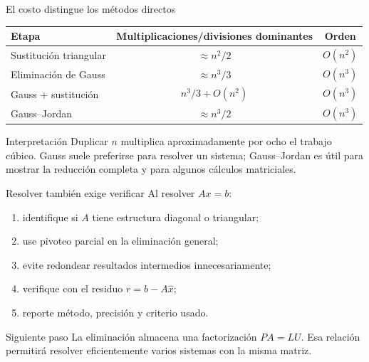 \documentclass[aspectratio=169,12pt]{beamer}
\begin{document}
\begin{frame}{El costo distingue los métodos directos}
\begin{center}
\begin{tabular}{lcc}
\toprule
Etapa & Multiplicaciones/divisiones dominantes & Orden \\
\midrule
Sustitución triangular & $\approx n^2/2$ & $O(n^2)$ \\
Eliminación de Gauss & $\approx n^3/3$ & $O(n^3)$ \\
Gauss + sustitución & $n^3/3+O(n^2)$ & $O(n^3)$ \\
Gauss--Jordan & $\approx n^3/2$ & $O(n^3)$ \\
\bottomrule
\end{tabular}
\end{center}
\begin{block}{Interpretación}
Duplicar $n$ multiplica aproximadamente por ocho el trabajo cúbico.
Gauss suele preferirse para resolver un sistema; Gauss--Jordan es útil para
mostrar la reducción completa y para algunos cálculos matriciales.
\end{block}
\end{frame}

\begin{frame}{Resolver también exige verificar}
Al resolver $Ax=b$:
\begin{enumerate}
  \item identifique si $A$ tiene estructura diagonal o triangular;
  \item use pivoteo parcial en la eliminación general;
  \item evite redondear resultados intermedios innecesariamente;
  \item verifique con el residuo $r=b-A\widehat x$;
  \item reporte método, precisión y criterio usado.
\end{enumerate}
\begin{block}{Siguiente paso}
La eliminación almacena una factorización $PA=LU$. Esa relación permitirá
resolver eficientemente varios sistemas con la misma matriz.
\end{block}
\end{frame}
\end{document}
